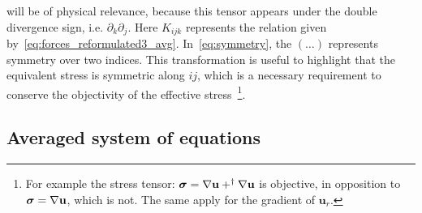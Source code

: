 will be of physical relevance, because this tensor appears under the double divergence sign, i.e. $\partial_k \partial_j$.
Here $K_{ijk}$ represents the relation given by~\ref{eq:forces_reformulated3_avg}. 
In~\ref{eq:symmetry}, the $(\ldots)$ represents symmetry over two indices. 
This transformation is useful to highlight that the equivalent stress is symmetric along $ij$, which is a necessary requirement to conserve the objectivity of the effective stress~\citep{renee2023thermomecanique}\footnote{
    For example the stress tensor: $\bm\sigma = \mathbf{\nabla} \textbf{u}+ ^\dagger \mathbf{\nabla} \textbf{u}$ is objective, in opposition to $\bm\sigma = \mathbf{\nabla} \textbf{u}$, which is not. 
    The same apply for the gradient of $\textbf{u}_r$. 
}. 

\subsection{Averaged system of equations}

